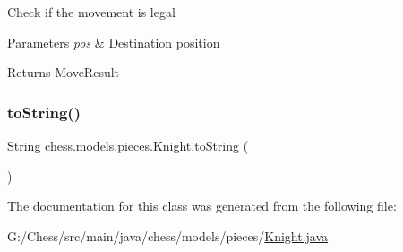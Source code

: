 Check if the movement is legal 
\begin{DoxyParams}{Parameters}
{\em pos} & Destination position \\
\hline
\end{DoxyParams}
\begin{DoxyReturn}{Returns}
Move\+Result 
\end{DoxyReturn}
\mbox{\label{classchess_1_1models_1_1pieces_1_1_knight_a18c83fa9040a0035d86c3354f3ada4ea}} 
\subsubsection{\texorpdfstring{to\+String()}{toString()}}
{\footnotesize\ttfamily String chess.\+models.\+pieces.\+Knight.\+to\+String (\begin{DoxyParamCaption}{ }\end{DoxyParamCaption})}



The documentation for this class was generated from the following file\+:\begin{DoxyCompactItemize}
\item 
G\+:/\+Chess/src/main/java/chess/models/pieces/\mbox{\hyperlink{_knight_8java}{Knight.\+java}}\end{DoxyCompactItemize}
